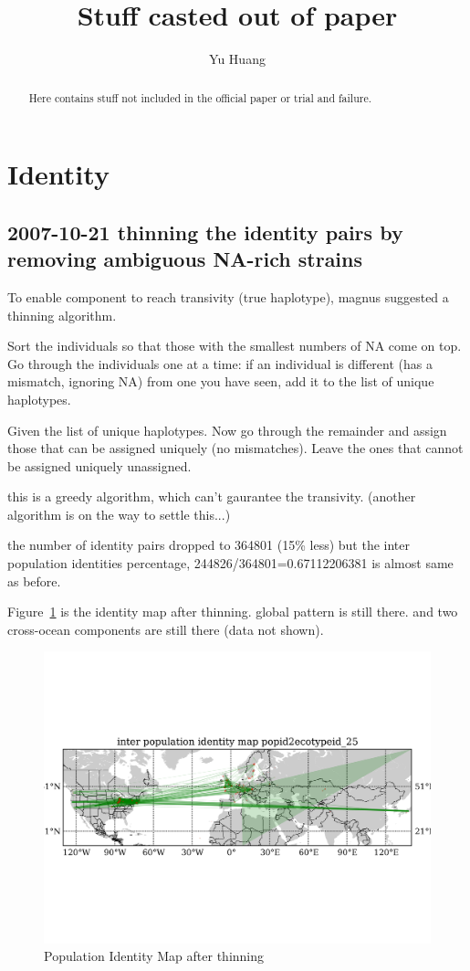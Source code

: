 \documentclass[a4paper,10pt]{article}
\title{Stuff casted out of paper}
\author{Yu Huang}
\begin{document}
\maketitle

\begin{abstract}
Here contains stuff not included in the official paper or trial and failure.
\end{abstract}

\tableofcontents

\section{Identity}

\subsection{2007-10-21 thinning the identity pairs by removing ambiguous NA-rich strains}
To enable component to reach transivity (true haplotype), magnus suggested a thinning algorithm.

Sort the individuals so that those with the smallest numbers of NA come on top.  Go through the individuals one at a time: if an individual is different (has a mismatch, ignoring NA) from one you have seen, add it to the list of unique haplotypes.

Given the list of unique haplotypes. Now go through the remainder and assign those that can be assigned uniquely (no mismatches).  Leave the ones that cannot be assigned uniquely unassigned.

this is a greedy algorithm, which can't gaurantee the transivity. (another algorithm is on the way to settle this...)

the number of identity pairs dropped to 364801 (15\% less) but the inter population identities percentage, 244826/364801=0.67112206381 is almost same as before.

Figure~\ref{f28} is the identity map after thinning. global pattern is still there. and two cross-ocean components are still there (data not shown).

\begin{figure}
\includegraphics[width=1\textwidth]{figures/identity_map2_complete_site_network.png}
\caption{Population Identity Map after thinning}\label{f28}
\end{figure}
\end{document}
